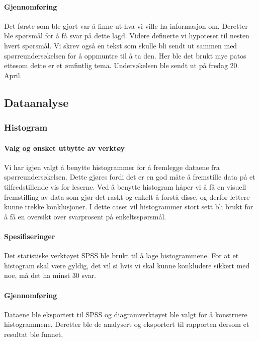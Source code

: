 \paragraph{Gjennomføring}
Det første som ble gjort var å finne ut hva vi ville ha informasjon om. Deretter ble spørsmål for å få svar på dette lagd. Videre definerte vi hypoteser til nesten hvert spørsmål. Vi skrev også en tekst som skulle bli sendt ut sammen med spørreundersøkelsen for å oppmuntre til å ta den. Her ble det brukt mye patos ettesom dette er et ømfintlig tema. Undersøkelsen ble sendt ut på fredag 20. April. 


\subsection{Dataanalyse}

\subsubsection{Histogram}

\paragraph{Valg og ønsket utbytte av verktøy}
Vi har igjen valgt å benytte histogrammer for å fremlegge dataene fra spørreundersøkelsen. Dette gjøres fordi det er en god måte å fremstille data på et tilfredstillende vis for leserne. Ved å benytte histogram håper vi å få en visuell fremstilling av data som gjør det raskt og enkelt å forstå disse, og derfor lettere kunne trekke konklusjoner. I dette caset vil histogrammer stort sett bli brukt for å få en oversikt over svarprosent på enkeltsspørsmål. 

\paragraph{Spesifiseringer}
Det statistiske verktøyet SPSS ble brukt til å lage histogrammene. For at et histogram skal være gyldig, det vil si hvis vi skal kunne konkludere sikkert med noe, må det ha minst 30 svar. 

\paragraph{Gjennomføring}
Dataene ble eksportert til SPSS og diagramverktøyet ble valgt for å konstruere histogrammene. Deretter ble de analysert og eksportert til rapporten dersom et resultat ble funnet. 



